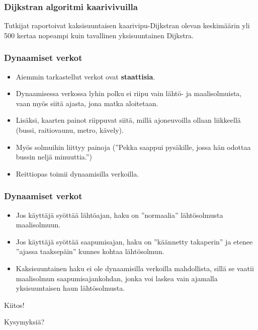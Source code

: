 \documentclass{beamer}
\begin{document}
\begin{frame}
  \frametitle{Dijkstran algoritmi kaarivivuilla}
  Tutkijat raportoivat kaksisuuntaisen kaarivipu-Dijkstran olevan keskimäärin yli 500 kertaa nopeampi kuin tavallinen yksisuuntainen Dijkstra.
\end{frame}

\begin{frame}
  \frametitle{Dynaamiset verkot}
  \begin{itemize}
    \item Aiemmin tarkastellut verkot ovat \textbf{staattisia}.
    \item Dynaamisessa verkossa lyhin polku ei riipu vain lähtö- ja maalisolmuista, vaan myös siitä ajasta, jona matka aloitetaan.
    \item Lisäksi, kaarten painot riippuvat siitä, millä ajoneuvoilla ollaan liikkeellä (bussi, raitiovaunu, metro, kävely).
    \item Myös solmuihin liittyy painoja (''Pekka saappui pysäkille, jossa hän odottaa bussin neljä minuuttia.'')
    \item Reittiopas toimii dynaamisilla verkoilla.
  \end{itemize}
\end{frame}

\begin{frame}
  \frametitle{Dynaamiset verkot}
  \begin{itemize}
      \item Jos käyttäjä syöttää lähtöajan, haku on ''normaalia'' lähtösolmusta maalisolmuun.
      \item Jos käyttäjä syöttää saapumisajan, haku on ''käännetty takaperin'' ja etenee ''ajassa taaksepäin'' kunnes kohtaa lähtösolmun.
      \item Kaksisuuntainen haku ei ole dynaamisilla verkoilla mahdollista, sillä se vaatii maalisolmun saapumisajankohdan, jonka voi laskea vain ajamalla yksisuuntaisen haun lähtösolmusta.
  \end{itemize}
\end{frame}

\begin{frame}
  Kiitos!
\end{frame}

\begin{frame}
  Kysymyksiä?
\end{frame}
\end{document}
